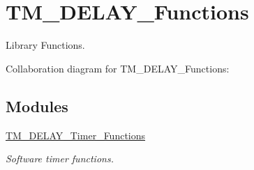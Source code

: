 \hypertarget{group___t_m___d_e_l_a_y___functions}{}\section{T\+M\+\_\+\+D\+E\+L\+A\+Y\+\_\+\+Functions}
\label{group___t_m___d_e_l_a_y___functions}


Library Functions.  


Collaboration diagram for T\+M\+\_\+\+D\+E\+L\+A\+Y\+\_\+\+Functions\+:
\subsection*{Modules}
\begin{DoxyCompactItemize}
\item 
\hyperlink{group___t_m___d_e_l_a_y___timer___functions}{T\+M\+\_\+\+D\+E\+L\+A\+Y\+\_\+\+Timer\+\_\+\+Functions}
\begin{DoxyCompactList}\small\item\em Software timer functions. \end{DoxyCompactList}\end{DoxyCompactItemize}

